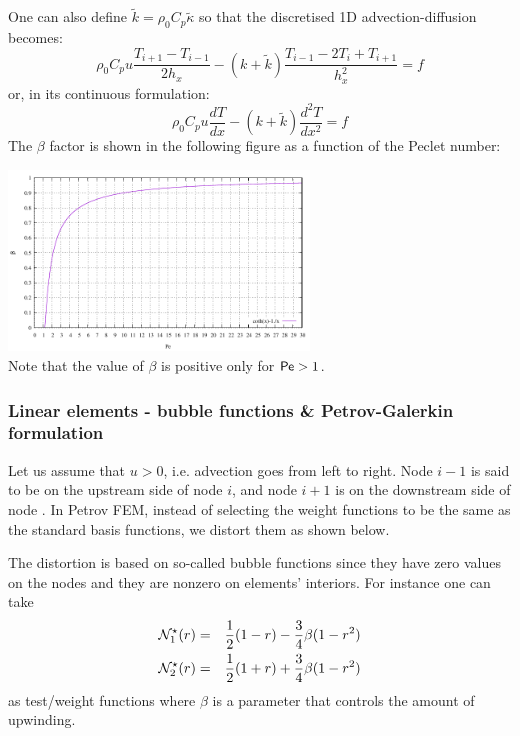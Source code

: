 One can also define $\tilde{k}=\rho_0 C_p \tilde{\kappa}$ so that 
the discretised 1D advection-diffusion becomes:
\begin{equation}
\rho_0 C_p u \frac{T_{i+1}-T_{i-1}}{2h_x}
- (k+ \tilde{k}) \frac{T_{i-1}-2T_i+T_{i+1}}{h_x^2}
= f 
\end{equation}
or, in its continuous formulation:
\[
\rho_0 C_p u \frac{dT}{dx} - (k+ \tilde{k}) \frac{d^2T}{dx^2} = f
\]
The $\beta$ factor is shown in the following figure as a function of the Peclet number:
\begin{center}
\includegraphics[width=8cm]{images/supg/beta}\\
{\captionfont Note that the value of $\beta$ is positive only for ${\mathsf{Pe}}>1$.}
\end{center}


\subsubsection{Linear elements - bubble functions \& Petrov-Galerkin formulation}

Let us assume that $u>0$, i.e. advection goes from left to right. 
Node $i-1$ is said to be on the upstream side of node $i$, and node $i+1$
is on the downstream side of node . In Petrov FEM, instead of selecting the weight functions to be the
same as the standard basis functions, we distort them as shown below.

The distortion is based on so-called bubble functions since they have zero
values on the nodes and they are nonzero on elements' interiors.
For instance one can take
\begin{eqnarray}
{{\mathcal{N}}}^\star_1(r)&=&\frac{1}{2}(1-r)-\frac{3}{4}\beta(1-r^2) \\
{{\mathcal{N}}}^\star_2(r)&=&\frac{1}{2}(1+r)+\frac{3}{4}\beta(1-r^2) 
\end{eqnarray}
as test/weight functions
where $\beta$ is a parameter that controls the amount of upwinding. 



